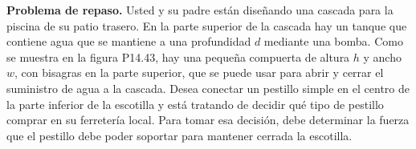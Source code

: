 \item \textbf{Problema de repaso.} Usted y su padre están diseñando una cascada para la piscina de su patio trasero. En la parte superior de la cascada hay un tanque que contiene agua que se mantiene a una profundidad $d$ mediante una bomba. Como se muestra en la figura P14.43, hay una pequeña compuerta de altura $h$ y ancho $w$, con bisagras en la parte superior, que se puede usar para abrir y cerrar el suministro de agua a la cascada. Desea conectar un pestillo simple en el centro de la parte inferior de la escotilla y está tratando de decidir qué tipo de pestillo comprar en su ferretería local. Para tomar esa decisión, debe determinar la fuerza que el pestillo debe poder soportar para mantener cerrada la escotilla.
